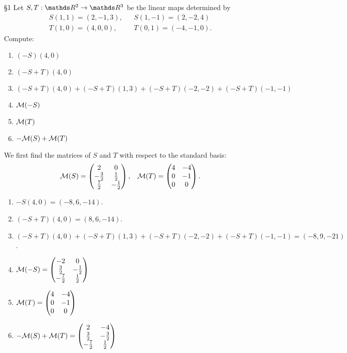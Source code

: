 \documentclass{review-sheet}
\begin{document}
\begin{problem}{\S 1}
  Let $S,T:\R^2\to \R^3$ be the linear maps determined by
  \begin{align*}
    S(1,1)=(2,-1,3), && S(1,-1) = (2,-2,4)\\
    T(1,0)=(4,0,0), && T(0,1) = (-4,-1,0)
  .\end{align*}
  Compute:
  \begin{enumerate}[label=(\alph*)]
    \item $(-S)(4,0)$
    \item  $(-S+T)(4,0)$
    \item  $(-S+T)(4,0)+(-S+T)(1,3)+(-S+T)(-2,-2)+(-S+T)(-1,-1)$ 
    \item $ \mathcal{M}(-S)$
    \item $\mathcal{M}(T)$
    \item $-\mathcal{M}(S)+\mathcal{M}(T)$
  \end{enumerate}
\end{problem}

\begin{solution}
  We first find the matrices of $S$ and $T$ with respect to the standard basis:
  \begin{align*}
    \mathcal{M}(S)=\begin{pmatrix} 2&0\\-\frac{3}{2}&\frac{1}{2}\\\frac{7}{2}&-\frac{1}{2}
      \end{pmatrix},&& \mathcal{M}(T)=\begin{pmatrix} 4&-4\\0&-1\\0&0 \end{pmatrix} 
  .\end{align*}

  \begin{enumerate}[label=(\alph*)]
    \item $-S(4,0)=(-8,6,-14)$.
    \item  $(-S+T)(4,0)=(8,6,-14)$.
    \item  $(-S+T)(4,0)+(-S+T)(1,3)+(-S+T)(-2,-2)+(-S+T)(-1,-1)=(-8,9,-21)$.
    \item $\mathcal{M}(-S)=\begin{pmatrix} -2&0\\\frac{3}{2}&-\frac{1}{2}\\-\frac{7}{2}&\frac{1}{2} \end{pmatrix} $ 
    \item $\mathcal{M}(T)=\begin{pmatrix} 4&-4\\0&-1\\0&0 \end{pmatrix}$
    \item $-\mathcal{M}(S)+\mathcal{M}(T)=\begin{pmatrix}
      2&-4\\\frac{3}{2}&-\frac{3}{2}\\-\frac{7}{2}&\frac{1}{2} \end{pmatrix} $
  \end{enumerate}
\end{solution}
\end{document}
